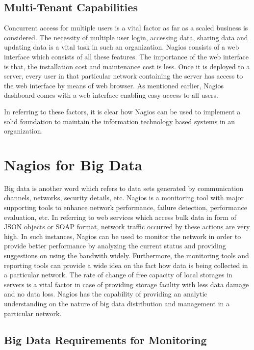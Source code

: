 \documentclass[9pt,twocolumn,twoside]{styles/osajnl}
\begin{document}
\subsection{Multi-Tenant Capabilities}

Concurrent access for multiple users is a vital factor as far as a
scaled business is considered. The necessity of multiple user login,
accessing data, sharing data and updating data is a vital task in such
an organization. Nagios consists of a web interface which consists of
all these features. The importance of the web interface is that, the
installation cost and maintenance cost is less. Once it is deployed to
a server, every user in that particular network containing the server
has access to the web interface by means of web browser. As mentioned
earlier, Nagios dashboard comes with a web interface enabling easy
access to all users.

In referring to these factors, it is clear how Nagios can be used to
implement a solid foundation to maintain the information technology
based systems in an organization.

\section{Nagios for Big Data}

Big data is another word which refers to data sets generated by
communication channels, networks, security details, etc. Nagios is a
monitoring tool with major supporting tools to enhance network
performance, failure detection, performance evaluation, etc. In
referring to web services which access bulk data in form of JSON
objects or SOAP format, network traffic occurred by these actions are
very high. In such instances, Nagios can be used to monitor the
network in order to provide better performance by analyzing the
current status and providing suggestions on using the bandwith
widely. Furthermore, the monitoring tools and reporting tools can
provide a wide idea on the fact how data is being collected in a
particular network. The rate of change of free capacity of local
storages in servers is a vital factor in case of providing storage
facility with less data damage and no data loss. Nagios has the
capability of providing an analytic understanding on the nature of big
data distribution and management in a particular network.

\subsection{Big Data Requirements for Monitoring}
\end{document}
